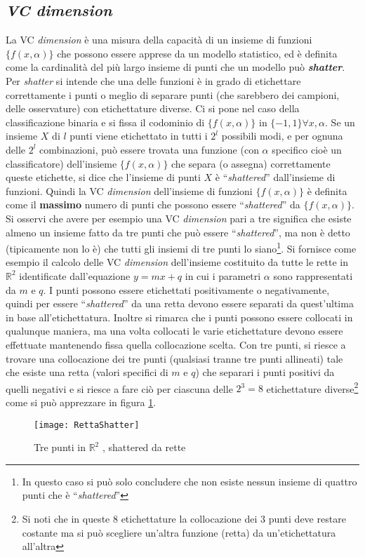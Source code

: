 \subsection{\textit{VC dimension}}
\label{sub:vcdim}
La \ac{VC} \textit{dimension} è una misura della capacità di un insieme di funzioni $\{f(x,\alpha)\}$ che possono essere apprese da un modello statistico, ed è definita come la cardinalità del più largo insieme di punti che un modello può \textbf{\textit{shatter}}. Per \textit{shatter} si intende che una delle funzioni è in grado di etichettare correttamente i punti o meglio di separare punti (che sarebbero dei campioni, delle osservature) con etichettature diverse. Ci si pone  nel caso della classificazione binaria e si fissa il codominio di $\{f(x,\alpha)\}$  in $\{-1,1\} \forall x,\alpha$.  Se un insieme $X$ di $l$ punti viene etichettato in tutti i $2^l$ possibili modi, e per ognuna delle $2^l$ combinazioni, può essere trovata una funzione (con $\alpha$ specifico cioè un classificatore) dell'insieme $\{f(x,\alpha)\}$ che separa (o assegna) correttamente queste etichette, si dice che l'insieme di punti $X$ è ``\textit{shattered}'' dall'insieme di funzioni. Quindi la \ac{VC} \textit{dimension} dell'insieme di funzioni $\{f(x,\alpha)\}$ è definita come il \textbf{massimo} numero di punti che possono essere ``\textit{shattered}'' da $\{f(x,\alpha)\}$. Si osservi che avere per esempio una \ac{VC} \textit{dimension}  pari a tre significa che esiste almeno un insieme fatto da tre punti che può essere ``\textit{shattered}'', ma non è detto (tipicamente non lo è) che tutti gli insiemi di tre punti lo siano\footnote{In questo caso si può solo concludere che non esiste nessun insieme di quattro punti che è ``\textit{shattered}''}. Si fornisce come esempio il calcolo delle \ac{VC} \textit{dimension} dell'insieme costituito da tutte le rette in $\mathbb{R}^2$ identificate dall'equazione $y = mx + q$ in cui i parametri $\alpha$ sono rappresentati da $m \text{ e } q$. I punti possono essere etichettati positivamente o negativamente, quindi per essere ``\textit{shattered}'' da una retta devono essere separati da quest'ultima in base all'etichettatura. Inoltre si rimarca che i punti possono essere collocati in qualunque maniera, ma una volta collocati le varie etichettature devono essere effettuate mantenendo fissa quella collocazione scelta. Con tre punti, si riesce a trovare una collocazione dei tre punti (qualsiasi tranne tre punti allineati) tale che esiste una retta (valori specifici di $m$ e $q$)  che separari i punti positivi da quelli negativi e si riesce a fare ciò per ciascuna delle $2^{3}=8$ etichettature diverse\footnote{Si noti che in queste 8 etichettature  la collocazione dei 3 punti deve restare costante ma si può scegliere un'altra funzione (retta) da un'etichettatura all'altra} come si può apprezzare in figura \ref{fig:sha}. 
\begin{figure}[htp]
	\centering
	\texttt{[image: RettaShatter]}
	\caption[Tre punti shattered nel piano]{Tre punti in $\mathbb{R}^{2}$ , shattered da rette}
   \label{fig:sha}
\end{figure} 

